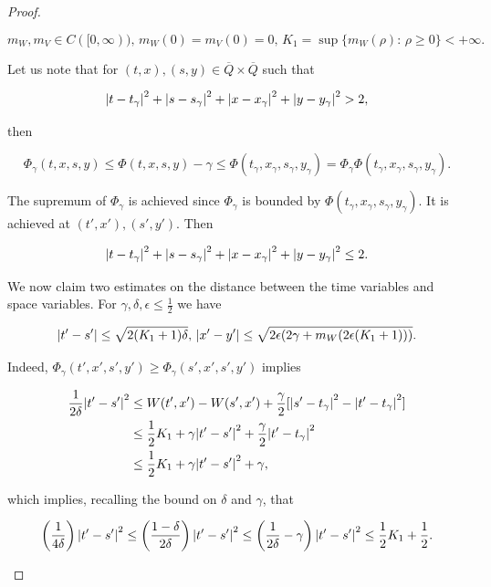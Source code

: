 \begin{proof}
\begin{enumerate}[label=\arabic*')]
        \[m_W,m_V\in C([0,\infty)),\, m_W(0)=m_V(0)=0,\, K_1=\sup\{m_W(\rho):\,\rho\geq0\}<+\infty.\]

        Let us note that for $(t,x),(s,y)\in\overline{Q}\times\overline{Q}$ such that 

        \[\abs{t-t_{\gamma}}^2+\abs{s-s_{\gamma}}^2 + \abs{x-x_{\gamma}}^2 + \abs{y-y_{\gamma}}^2>2,\]

        then

        \[\Phi_{\gamma}(t,x,s,y) \leq \Phi(t,x,s,y) - \gamma \leq \Phi(t_{\gamma},x_{\gamma},s_{\gamma},y_{\gamma}) = \Phi_{\gamma}\Phi(t_{\gamma},x_{\gamma},s_{\gamma},y_{\gamma}).\]

        The supremum of $\Phi_{\gamma}$ is achieved since $\Phi_{\gamma}$ is bounded by $\Phi(t_{\gamma},x_{\gamma},s_{\gamma},y_{\gamma})$. It is achieved at $(t',x'),(s',y')$. Then

        \begin{equation*}
            \abs{t-t_{\gamma}}^2+\abs{s-s_{\gamma}}^2 + \abs{x-x_{\gamma}}^2 + \abs{y-y_{\gamma}}^2\leq2.
        \end{equation*}

        We now claim two estimates on the distance between the time variables and space variables. For $\gamma,\delta,\epsilon\leq\frac{1}{2}$ we have

        \begin{equation}\label{4-2-inproofSup:unboundedCLAIMS}
            \abs{t'-s'} \leq \sqrt{2(K_1+1)\delta},\,\abs{x'-y'}\leq\sqrt{2\epsilon(2\gamma + m_W(2\epsilon(K_1+1)))}.
        \end{equation}

        Indeed, $\Phi_{\gamma}(t',x',s',y')\geq\Phi_{\gamma}(s',x',s',y')$ implies

        \begin{align*}
            \frac{1}{2\delta}\abs{t'-s'}^2 & \leq W(t',x')-W(s',x') + \frac{\gamma}{2}[\abs{s'-t_{\gamma}}^2-\abs{t'-t_{\gamma}}^2] \\
            & \leq \frac{1}{2}K_1 + \gamma\abs{t'-s'}^2 + \frac{\gamma}{2}\abs{t'-t_{\gamma}}^2 \\
            & \leq \frac{1}{2}K_1 + \gamma\abs{t'-s'}^2 + \gamma,
        \end{align*}

        which implies, recalling the bound on $\delta$ and $\gamma$, that 

        \[\left(\frac{1}{4\delta}\right)\abs{t'-s'}^2\leq\left(\frac{1-\delta}{2\delta}\right)\abs{t'-s'}^2\leq\left(\frac{1}{2\delta}-\gamma\right)\abs{t'-s'}^2\leq \frac{1}{2}K_1 + \frac{1}{2}.\]


\end{enumerate}
\end{proof}
